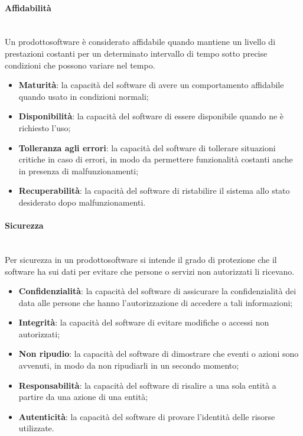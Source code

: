 	\paragraph{Affidabilità} \mbox{}\\
	Un prodotto\glosp software è considerato affidabile quando mantiene un livello di prestazioni costanti per un determinato intervallo di tempo sotto precise condizioni che possono variare nel tempo.
	\begin{itemize} \mbox{}\\
		\item \textbf{Maturità}: la capacità del software di avere un comportamento affidabile quando usato in condizioni normali;
		\item \textbf{Disponibilità}: la capacità del software di essere disponibile quando ne è richiesto l'uso;
		\item \textbf{Tolleranza agli errori}: la capacità del software di tollerare situazioni critiche in caso di errori, in modo da permettere funzionalità costanti anche in presenza di malfunzionamenti;
		\item \textbf{Recuperabilità}: la capacità del software di ristabilire il sistema allo stato desiderato dopo malfunzionamenti.
	\end{itemize}
	\paragraph{Sicurezza} \mbox{}\\
	Per sicurezza in un prodotto\glosp software si intende il grado di protezione che il software ha sui dati per evitare che persone o servizi non autorizzati li ricevano.
	\begin{itemize}
		\item \textbf{Confidenzialità}: la capacità del software di assicurare la confidenzialità dei data alle persone che hanno l'autorizzazione di accedere a tali informazioni;
		\item \textbf{Integrità}: la capacità del software di evitare modifiche o accessi non autorizzati;
		\item \textbf{Non ripudio}: la capacità del software di dimostrare che eventi o azioni sono avvenuti, in modo da non ripudiarli in un secondo momento;
		\item \textbf{Responsabilità}: la capacità del software di risalire a una sola entità a partire da una azione di una entità;
		\item \textbf{Autenticità}: la capacità del software di provare l'identità delle risorse utilizzate.
	\end{itemize}
